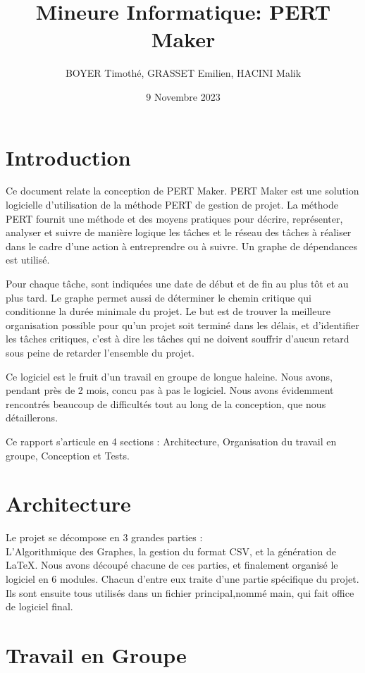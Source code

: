 \documentclass{article}
\title{\centering Mineure Informatique: 
PERT Maker}
\author{BOYER Timothé, GRASSET Emilien, HACINI Malik}
\date{9 Novembre 2023}
\begin{document}

\maketitle
\tableofcontents{}
\newpage
\section{Introduction}

Ce document relate la conception de PERT Maker.
PERT Maker est une solution logicielle d'utilisation de la méthode PERT de gestion de projet.
La méthode PERT fournit une méthode et des moyens pratiques pour décrire,
représenter, analyser et suivre de manière logique les tâches et le réseau des tâches à réaliser dans le cadre d'une 
action à entreprendre ou à suivre.
Un graphe de dépendances est utilisé. 

Pour chaque tâche, sont indiquées une date de début et de fin au plus tôt et au plus tard. 
Le graphe permet aussi de déterminer le chemin critique qui conditionne la durée minimale du projet.
Le but est de trouver la meilleure organisation possible pour qu'un projet soit terminé dans les délais, et d'identifier les tâches critiques, 
c'est à dire les tâches qui ne doivent souffrir d'aucun retard sous peine de retarder l'ensemble du projet.

Ce logiciel est le fruit d'un travail en groupe de longue haleine. Nous avons, pendant près de 2 mois, concu pas à pas le logiciel.
Nous avons évidemment rencontrés beaucoup de difficultés tout au long de la conception, que nous détaillerons.

Ce rapport s'articule en 4 sections : Architecture, Organisation du travail en groupe, Conception et Tests.

\section{Architecture}
Le projet se décompose en 3 grandes parties : \\L'Algorithmique des Graphes,
la gestion du format CSV, et la génération de LaTeX.
Nous avons découpé chacune de ces parties, et finalement organisé le logiciel en 6 modules. Chacun d'entre eux traite d'une partie spécifique du projet.
Ils sont ensuite tous utilisés dans un fichier principal,nommé main, qui fait office de logiciel final.
\section{Travail en Groupe}
\end{document}
